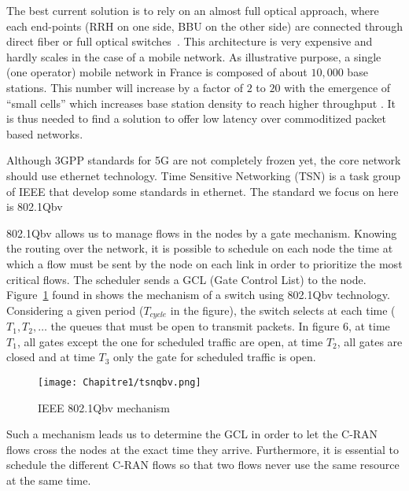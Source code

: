 The best current solution is to rely on an almost full optical approach, where each end-points (RRH on one side, BBU on the other side) are connected through direct fiber or full optical switches~\cite{pizzinat2015things,tayq2017real}. This architecture is very expensive and hardly scales in the case of a mobile network. As illustrative purpose, a single (one operator) mobile network in France is composed of about $10,000$ base stations. This number will increase by a factor of $2$ to $20$ with the emergence of “small cells” which increases base station density to reach higher throughput \cite{leclerc2016transmission,leclerc2016signaling}. It is thus needed to find a solution to offer low latency over commoditized packet based networks. 

Although 3GPP standards for 5G are not completely frozen yet, the core network should use ethernet technology. Time Sensitive Networking (TSN) is a task group of IEEE that develop some standards in ethernet. The standard we focus on here is 802.1Qbv \cite{ieee802}  
  
802.1Qbv allows us to manage flows in the nodes by a gate mechanism. Knowing the routing over the network, it is possible to schedule on each node the time at which a flow must be sent by the node on each link in order to prioritize the most critical flows. The scheduler sends a  GCL (Gate Control List) to the node. 
Figure~\ref{fig:tsnqbv} found in \cite{durr2016no} shows the mechanism of a switch using 802.1Qbv technology. Considering a given period ($T_{cycle}$ in the figure), the switch selects at each time ($T_1 , T_2 , \ldots$ the queues that must be open to transmit packets. In figure 6, at time $T_1$, all gates except the one for scheduled traffic are open, at time $T_2$, all gates are closed and at time $T_3$ only the gate for scheduled traffic is open.
  \begin{figure}[h]
      \begin{center}
      \texttt{[image: Chapitre1/tsnqbv.png]}
      \end{center}
      \caption{IEEE 802.1Qbv mechanism}\label{fig:tsnqbv}
      \end{figure}
      
Such a mechanism leads us to determine the GCL in order to let the C-RAN flows cross the nodes at the exact time they arrive. 
Furthermore, it is essential to schedule the different C-RAN flows so that two flows never use the same resource at the same time.
   
